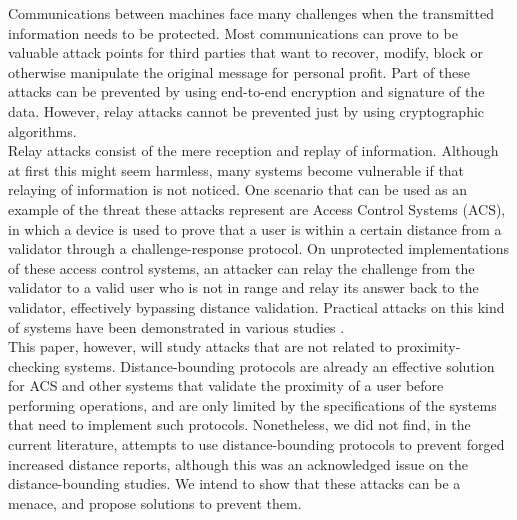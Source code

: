 \documentclass{article}
\begin{document}
Communications between machines face many challenges when the transmitted information needs to be protected. Most communications can prove to be valuable attack points for third parties that want to recover, modify, block or otherwise manipulate the original message for personal profit. Part of these attacks can be prevented by using end-to-end encryption and signature of the data. However, relay attacks cannot be prevented just by using cryptographic algorithms.\\

Relay attacks consist of the mere reception and replay of information. Although at first this might seem harmless, many systems become vulnerable if that relaying of information is not noticed. One scenario that can be used as an example of the threat these attacks represent are Access Control Systems (ACS), in which a device is used to prove that a user is within a certain distance from a validator through a challenge-response protocol. On unprotected implementations of these access control systems, an attacker can relay the challenge from the validator to a valid user who is not in range and relay its answer back to the validator, effectively bypassing distance validation. Practical attacks on this kind of systems have been demonstrated in various studies \cite{francillon2011relay, francis2010practical, hancke2005practical, markantonakis2012practical}.\\

This paper, however, will study attacks that are not related to proximity-checking systems. Distance-bounding protocols are already an effective solution for ACS and other systems that validate the proximity of a user before performing operations, and are only limited by the specifications of the systems that need to implement such protocols. Nonetheless, we did not find, in the current literature, attempts to use distance-bounding protocols to prevent forged increased distance reports, although this was an acknowledged issue on the distance-bounding studies. We intend to show that these attacks can be a menace, and propose solutions to prevent them.\\
\end{document}
